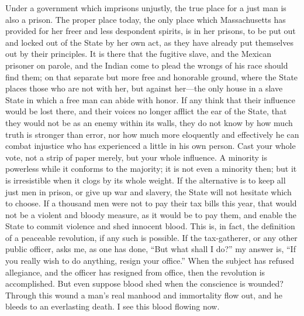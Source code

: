 \documentclass[letterpaper,12pt]{article}
\begin{document}
Under a government which imprisons unjustly, the true place for a just man is
also a prison. The proper place today, the only place which Massachusetts has
provided for her freer and less despondent spirits, is in her prisons, to be put
out and locked out of the State by her own act, as they have already put
themselves out by their principles. It is there that the fugitive slave, and the
Mexican prisoner on parole, and the Indian come to plead the wrongs of his race
should find them; on that separate but more free and honorable ground, where the
State places those who are not with her, but against her---the only house in
a slave State in which a free man can abide with honor. If any think that their
influence would be lost there, and their voices no longer afflict the ear of the
State, that they would not be as an enemy within its walls, they do not know by
how much truth is stronger than error, nor how much more eloquently and
effectively he can combat injustice who has experienced a little in his own
person. Cast your whole vote, not a strip of paper merely, but your whole
influence. A minority is powerless while it conforms to the majority; it is not
even a minority then; but it is irresistible when it clogs by its whole weight.
If the alternative is to keep all just men in prison, or give up war and
slavery, the State will not hesitate which to choose. If a thousand men were not
to pay their tax bills this year, that would not be a violent and bloody
measure, as it would be to pay them, and enable the State to commit violence and
shed innocent blood. This is, in fact, the definition of a peaceable revolution,
if any such is possible.  If the tax-gatherer, or any other public officer, asks
me, as one has done, \enquote{But what shall I do?} my answer is, \enquote{If
    you really wish to do anything, resign your office.} When the subject has
refused allegiance, and the officer has resigned from office, then the
revolution is accomplished.  But even suppose blood shed when the conscience is
wounded? Through this wound a man's real manhood and immortality flow out, and
he bleeds to an everlasting death. I see this blood flowing now.
\end{document}
